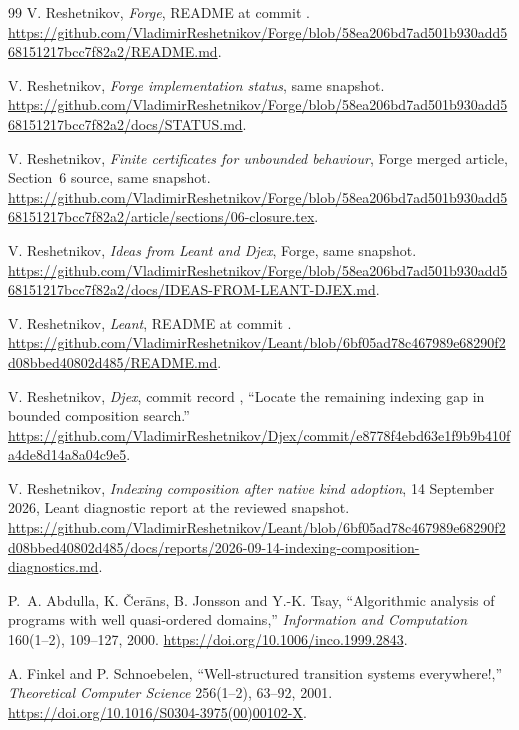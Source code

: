 \documentclass[11pt,a4paper]{article}
\theoremstyle{definition}
\begin{document}
\clearpage
\begingroup
\small
\begin{thebibliography}{99}
V. Reshetnikov, \emph{Forge}, README at commit
.
\url{https://github.com/VladimirReshetnikov/Forge/blob/58ea206bd7ad501b930add568151217bcc7f82a2/README.md}.

V. Reshetnikov, \emph{Forge implementation status}, same snapshot.
\url{https://github.com/VladimirReshetnikov/Forge/blob/58ea206bd7ad501b930add568151217bcc7f82a2/docs/STATUS.md}.

V. Reshetnikov, \emph{Finite certificates for unbounded behaviour}, Forge
merged article, Section~6 source, same snapshot.
\url{https://github.com/VladimirReshetnikov/Forge/blob/58ea206bd7ad501b930add568151217bcc7f82a2/article/sections/06-closure.tex}.

V. Reshetnikov, \emph{Ideas from Leant and Djex}, Forge, same snapshot.
\url{https://github.com/VladimirReshetnikov/Forge/blob/58ea206bd7ad501b930add568151217bcc7f82a2/docs/IDEAS-FROM-LEANT-DJEX.md}.

V. Reshetnikov, \emph{Leant}, README at commit
.
\url{https://github.com/VladimirReshetnikov/Leant/blob/6bf05ad78c467989e68290f2d08bbed40802d485/README.md}.

V. Reshetnikov, \emph{Djex}, commit record
, ``Locate the remaining indexing gap in bounded composition search.''
\url{https://github.com/VladimirReshetnikov/Djex/commit/e8778f4ebd63e1f9b9b410fa4de8d14a8a04c9e5}.

V. Reshetnikov, \emph{Indexing composition after native kind adoption},
14 September 2026, Leant diagnostic report at the reviewed snapshot.
\url{https://github.com/VladimirReshetnikov/Leant/blob/6bf05ad78c467989e68290f2d08bbed40802d485/docs/reports/2026-09-14-indexing-composition-diagnostics.md}.

P.~A. Abdulla, K. \v{C}er\=ans, B. Jonsson and Y.-K. Tsay,
``Algorithmic analysis of programs with well quasi-ordered domains,''
\emph{Information and Computation} 160(1--2), 109--127, 2000.
\url{https://doi.org/10.1006/inco.1999.2843}.

A. Finkel and P. Schnoebelen, ``Well-structured transition systems everywhere!,''
\emph{Theoretical Computer Science} 256(1--2), 63--92, 2001.
\url{https://doi.org/10.1016/S0304-3975(00)00102-X}.


\end{thebibliography}
\end{document}
